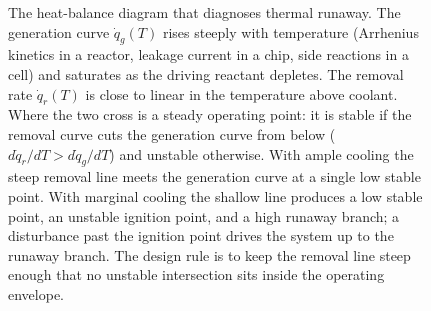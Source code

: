 \begin{figure}[htbp]
\centering
{}
\caption[Thermal-runaway heat-balance diagram]{The heat-balance diagram
that diagnoses thermal runaway. The generation curve $\dot{q}_g(T)$ rises
steeply with temperature (Arrhenius kinetics in a reactor, leakage
current in a chip, side reactions in a cell) and saturates as the driving
reactant depletes. The removal rate $\dot{q}_r(T)$ is close to linear in
the temperature above coolant. Where the two cross is a steady operating
point: it is stable if the removal curve cuts the generation curve from
below ($d\dot{q}_r/dT > d\dot{q}_g/dT$) and unstable otherwise. With ample
cooling the steep removal line meets the generation curve at a single low
stable point. With marginal cooling the shallow line produces a low
stable point, an unstable ignition point, and a high runaway branch; a
disturbance past the ignition point drives the system up to the runaway
branch. The design rule is to keep the removal line steep enough that no
unstable intersection sits inside the operating envelope.}
\label{fig:vol04ch05:runaway-balance}
\end{figure}

